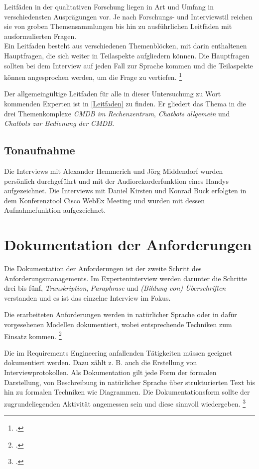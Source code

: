 Leitfäden in der qualitativen Forschung liegen in Art und Umfang in verschiedensten Ausprägungen vor. Je nach Forschungs- und Interviewstil reichen sie von groben Themensammlungen bis hin zu ausführlichen Leitfäden mit ausformulierten Fragen.\\
Ein Leitfaden besteht aus verschiedenen Themenblöcken, mit darin enthaltenen Hauptfragen, die sich weiter in Teilaspekte aufgliedern können. Die Hauptfragen sollten bei dem Interview auf jeden Fall zur Sprache kommen und die Teilaspekte können angesprochen werden, um die Frage zu vertiefen.
\footcite[Vgl.][27\psq]{Bogner_2014_Interview}

Der allgemeingültige Leitfaden für alle in dieser Untersuchung zu Wort kommenden Experten ist in \autoref{Leitfaden} zu finden. Er gliedert das Thema in die drei Themenkomplexe \textit{CMDB im Rechenzentrum}, \textit{Chatbots allgemein} und \textit{Chatbots zur Bedienung der CMDB}.

\subsection{Tonaufnahme}
Die Interviews mit Alexander Hemmerich und Jörg Middendorf wurden persönlich durchgeführt und mit der Audiorekorderfunktion eines Handys aufgezeichnet. Die Interviews mit Daniel Kirsten und Konrad Buck erfolgten in dem Konferenztool Cisco WebEx Meeting und wurden mit dessen Aufnahmefunktion aufgezeichnet.




\section{Dokumentation der Anforderungen}
Die Dokumentation der Anforderungen ist der zweite Schritt des Anforderungsmanagements. Im Experteninterview werden darunter die Schritte drei bis fünf, \textit{Transkription}, \textit{Paraphrase} und \textit{(Bildung von) Überschriften} verstanden und es ist das einzelne Interview im Fokus.

Die erarbeiteten Anforderungen werden in natürlicher Sprache oder in dafür vorgesehenen Modellen dokumentiert, wobei entsprechende Techniken zum Einsatz kommen. \footcite[Vgl.][4]{Pohl_2015_Requirements}

Die im Requirements Engineering anfallenden Tätigkeiten müssen geeignet dokumentiert werden. Dazu zählt z. B. auch die Erstellung von Interviewprotokollen. Als Dokumentation gilt jede Form der formalen Darstellung, von Beschreibung in natürlicher Sprache über strukturierten Text bis hin zu formalen Techniken wie Diagrammen. Die Dokumentationsform sollte der zugrundeliegenden Aktivität angemessen sein und diese sinnvoll wiedergeben. \footcite[Vgl.][35\psqq]{Pohl_2015_Requirements}


